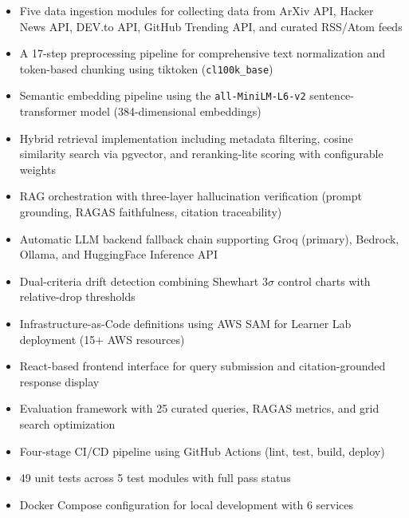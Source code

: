 \documentclass[12pt,a4paper]{report}
\begin{document}
\begin{itemize}

\item Five data ingestion modules for collecting data from ArXiv API, Hacker News API, DEV.to API, GitHub Trending API, and curated RSS/Atom feeds

\item A 17-step preprocessing pipeline for comprehensive text normalization and token-based chunking using tiktoken (\texttt{cl100k\_base})

\item Semantic embedding pipeline using the \texttt{all-MiniLM-L6-v2} sentence-transformer model (384-dimensional embeddings)

\item Hybrid retrieval implementation including metadata filtering, cosine similarity search via pgvector, and reranking-lite scoring with configurable weights

\item RAG orchestration with three-layer hallucination verification (prompt grounding, RAGAS faithfulness, citation traceability)

\item Automatic LLM backend fallback chain supporting Groq (primary), Bedrock, Ollama, and HuggingFace Inference API

\item Dual-criteria drift detection combining Shewhart $3\sigma$ control charts with relative-drop thresholds

\item Infrastructure-as-Code definitions using AWS SAM for Learner Lab deployment (15+ AWS resources)

\item React-based frontend interface for query submission and citation-grounded response display

\item Evaluation framework with 25 curated queries, RAGAS metrics, and grid search optimization

\item Four-stage CI/CD pipeline using GitHub Actions (lint, test, build, deploy)

\item 49 unit tests across 5 test modules with full pass status

\item Docker Compose configuration for local development with 6 services

\end{itemize}
\end{document}
